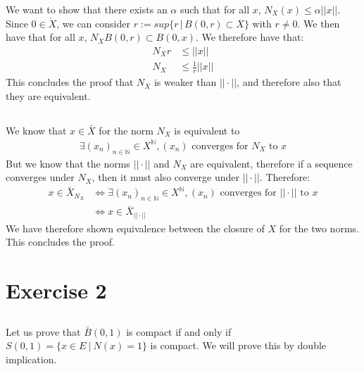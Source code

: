 \documentclass{article}
\begin{document}
\subsubsection{} %

We want to show that there exists an $\alpha$ such that for all $x$, $N_X(x) \leq \alpha ||x||$.
Since $0 \in \mathring{X}$, we can consider $r := sup\{r \, | \, B(0,r) \subset X \}$ with $r \neq 0$. We then have that for all $x$, $N_XB(0,r) \subset B(0,x)$. We therefore have that:
\begin{align*}
	N_Xr &\leq ||x||\\
	N_X &\leq \frac{1}{r}||x||
\end{align*}
This concludes the proof that $N_X$ is weaker than $|| \cdot ||$, and therefore also that they are equivalent.

\subsection{} %

We know that $x \in \bar{X}$ for the norm $N_X$ is equivalent to
\begin{align*}
	\exists (x_n)_{n \in \mathbb{N}} \in X^{\mathbb{N}}, (x_n) \text{ converges for }N_X \text{ to } x
\end{align*}
But we know that the norms $||\cdot ||$ and $N_X$ are equivalent, therefore if a sequence converges under $N_X$, then it must also converge under $|| \cdot ||$. Therefore:
\begin{align*}
	 x \in \bar{X}_{N_X} &\Leftrightarrow \exists (x_n)_{n \in \mathbb{N}} \in X^{\mathbb{N}},(x_n) \text{ converges for }|| \cdot || \text{ to } x\\
	&\Leftrightarrow x \in \bar{X}_{|| \cdot ||}
\end{align*}
We have therefore shown equivalence between the closure of $X$ for the two norms. This concludes the proof.
	


\section{Exercise 2}

\subsection{} %

Let us prove that $\bar{B}(0,1)$ is compact if and only if $S(0, 1) = \{ x\in E \ | \ N(x)=1 \}$ is compact. We will prove this by double implication. \\
\end{document}
